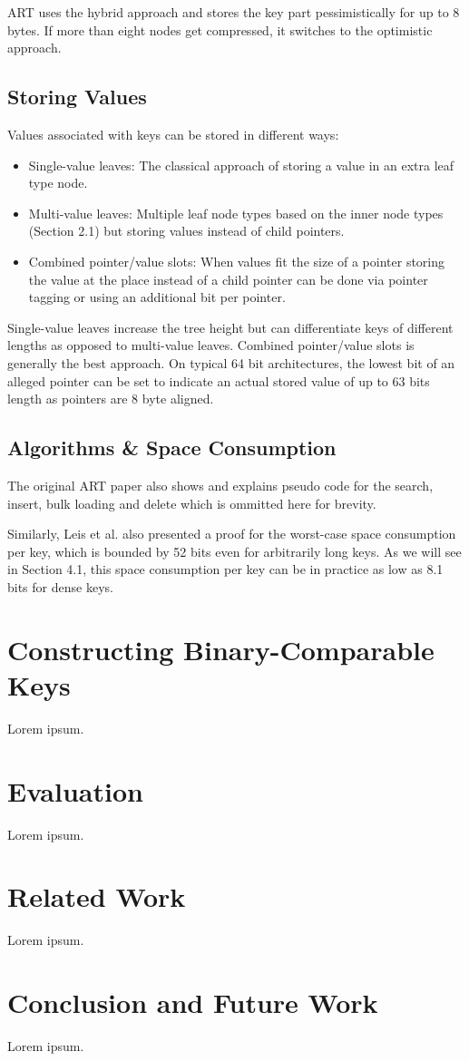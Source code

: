 \documentclass[acmtog, nonacm]{acmart}
\begin{document}
ART uses the hybrid approach and stores the key part pessimistically for up to 8 bytes. If more than eight nodes 
get compressed, it switches to the optimistic approach.

\subsection{Storing Values}
Values associated with keys can be stored in different ways:
\begin{itemize}
    \item Single-value leaves: The classical approach of storing a value in an extra leaf type node.
    \item Multi-value leaves: Multiple leaf node types based on the inner node types (Section 2.1) 
    but storing values instead of child pointers.
    \item Combined pointer/value slots: When values fit the size of a pointer storing the value at the place instead 
    of a child pointer can be done via pointer tagging or using an additional bit per pointer.
\end{itemize}

Single-value leaves increase the tree height but can differentiate keys of different lengths as opposed to 
multi-value leaves. Combined pointer/value slots is generally the best approach. On typical 64 bit architectures, 
the lowest bit of an alleged pointer can be set to indicate an actual stored value of up to 63 bits length as 
pointers are 8 byte aligned.

\subsection{Algorithms \& Space Consumption}
The original ART paper \cite{6544812} also shows and explains pseudo code for the search, insert, 
bulk loading and delete which is ommitted here for brevity.

Similarly, Leis et al. also presented a proof for the worst-case space consumption per key, which is bounded by 52 bits even for
arbitrarily long keys. As we will see in Section 4.1, this space consumption per key can be in practice as low as 8.1 bits
for dense keys.

\section{Constructing Binary-Comparable Keys}
Lorem ipsum.

\section{Evaluation}
Lorem ipsum.

\section{Related Work}
Lorem ipsum.

\section{Conclusion and Future Work}
Lorem ipsum.



\end{document}
